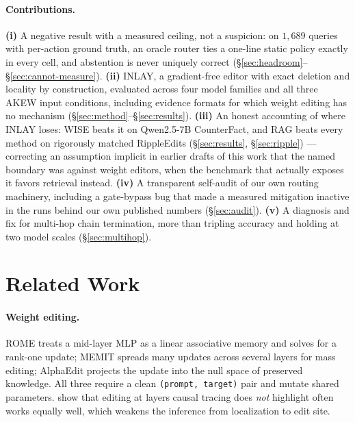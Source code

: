 \documentclass[11pt]{article}
\begin{document}
\paragraph{Contributions.}
\textbf{(i)} A negative result with a measured ceiling, not a suspicion: on
$1{,}689$ queries with per-action ground truth, an oracle router ties a
one-line static policy exactly in every cell, and abstention is never
uniquely correct (\S\ref{sec:headroom}--\S\ref{sec:cannot-measure}).
\textbf{(ii)} INLAY, a gradient-free editor with exact deletion and locality
by construction, evaluated across four model families and all three AKEW
input conditions, including evidence formats for which weight editing has no
mechanism (\S\ref{sec:method}--\S\ref{sec:results}).
\textbf{(iii)} An honest accounting of where INLAY loses: WISE beats it on
Qwen2.5-7B CounterFact, and RAG beats every method on rigorously matched
RippleEdits (\S\ref{sec:results}, \S\ref{sec:ripple}) --- correcting an
assumption implicit in earlier drafts of this work that the named boundary
was against weight editors, when the benchmark that actually exposes it
favors retrieval instead.
\textbf{(iv)} A transparent self-audit of our own routing machinery,
including a gate-bypass bug that made a measured mitigation inactive in the
runs behind our own published numbers (\S\ref{sec:audit}).
\textbf{(v)} A diagnosis and fix for multi-hop chain termination, more than
tripling accuracy and holding at two model scales (\S\ref{sec:multihop}).

\section{Related Work}
\label{sec:related}

\paragraph{Weight editing.}
ROME \citep{meng2022rome} treats a mid-layer MLP as a linear associative
memory and solves for a rank-one update; MEMIT \citep{meng2023memit} spreads
many updates across several layers for mass editing; AlphaEdit
\citep{fang2025alphaedit} projects the update into the null space of
preserved knowledge. All three require a clean \texttt{(prompt, target)} pair
and mutate shared parameters. \citet{hase2023localization} show that editing
at layers causal tracing does \emph{not} highlight often works equally well,
which weakens the inference from localization to edit site.
\end{document}
